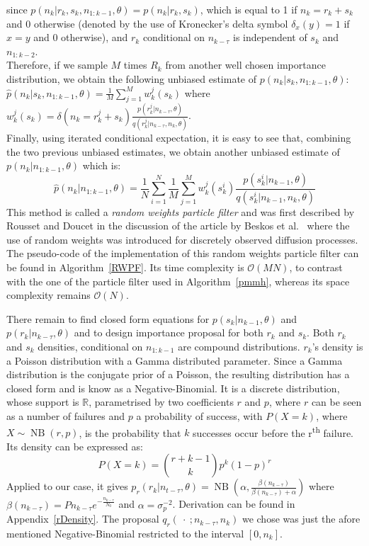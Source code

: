 \documentclass[12pt]{article}
\begin{document}
	since $p(n_k| r_k, s_k, n_{1:k-1}, \theta)=p(n_k| r_k, s_k)$, which is equal to 1 if $n_k = r_k + s_k$ and 0 otherwise (denoted by the use of Kronecker's delta symbol $\delta_x(y) = 1$ if $x=y$ and 0 otherwise), and $r_k$ conditional on $n_{k-\tau}$ is independent of $s_k$ and $n_{1:k-2}$. \\
	Therefore, if we sample $M$ times $R_k$ from another well chosen importance distribution, we obtain the following unbiased estimate of $p(n_k |s_k, n_{1:k-1}, \theta)$: $\hat{p}(n_k |s_k, n_{1:k-1}, \theta)=\frac{1}{M}\sum_{j=1}^{M}w_k^j(s_k)$ where $w_k^j(s_k) =\delta(n_k = r_k^j + s_k)\frac{p(r_k^j|n_{k-\tau}, \theta)}{q(r_k^j|n_{k-\tau}, n_k, \theta)}$. \\
	Finally, using iterated conditional expectation, it is easy to see that, combining the two previous unbiased estimates, we obtain another unbiased estimate of $p(n_k|n_{1:k-1},\theta)$ which is:
	\begin{equation}
	\hat{p}(n_k|n_{1:k-1},\theta) = \frac{1}{N}\sum_{i=1}^{N}\frac{1}{M}\sum_{j=1}^{M}w_k^j(s_k^i)\frac{p(s_k^i|n_{k-1}, \theta)}{q(s_k^i|n_{k-1}, n_k, \theta)}
	\end{equation}
	This method is called a \emph{random weights particle filter} and was first described by Rousset and Doucet in the discussion of the article by Beskos et al.~\cite{beskos2006exact} where the use of random weights was introduced for discretely observed diffusion processes.\\
	The pseudo-code of the implementation of this random weights particle filter can be found in Algorithm~\ref{RWPF}. Its time complexity is $\mathcal{O}(MN)$, to contrast with the one of the particle filter used in Algorithm~\ref{pmmh}, whereas its space complexity remains $\mathcal{O}(N)$.
	
	There remain to find closed form equations for $p(s_k|n_{k-1}, \theta)$ and $p(r_k|n_{k-\tau}, \theta)$ and to design importance proposal for both $r_k$ and $s_k$. Both $r_k$ and $s_k$ densities, conditional on $n_{1:{k-1}}$ are compound distributions. $r_k$'s density is a Poisson distribution with a Gamma distributed parameter. Since a Gamma distribution is the conjugate prior of a Poisson, the resulting distribution has a closed form and is know as a Negative-Binomial. It is a discrete distribution, whose support is $\mathbb{R}$, parametrised by two coefficients $r$ and $p$, where $r$ can be seen as a number of failures and $p$ a probability of success, with $P(X=k)$, where $X\sim \operatorname{NB}(r, p)$, is the probability that $k$ successes occur before the r\textsuperscript{th} failure. Its density can be expressed as: 
	\begin{equation*}
	P(X=k) = \binom{r+k-1}{k}p^k(1-p)^r
	\end{equation*}
	Applied to our case, it gives $p_r(r_k|n_{t-\tau}, \theta) = \operatorname{NB}(\alpha, \frac{\beta(n_{k-\tau})}{\beta(n_{k-\tau}) + \alpha})$ where  $\beta(n_{k-\tau}) = Pn_{k-\tau}e^{-\frac{n_{k-\tau}}{N_0}}$ and $\alpha = \sigma_p^{-2}$. Derivation can be found in Appendix~\ref{rDensity}.
	The proposal $q_r(\ \cdot \ ; n_{k-\tau}, n_k)$ we chose was just the afore mentioned Negative-Binomial restricted to the interval $[0, n_k]$.
	
\end{document}
